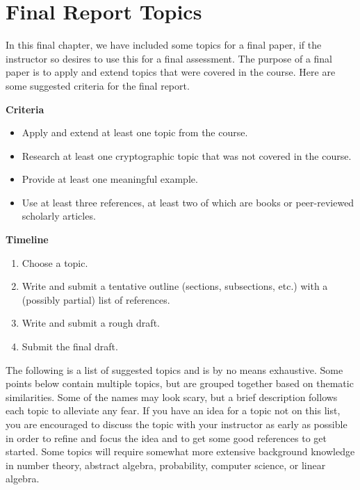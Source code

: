 \chapter{Final Report Topics}
\label{ch:topics}
	In this final chapter, we have included some topics for a final paper, if the instructor so desires to use this for a final assessment. The purpose of a final paper is to apply and extend topics that were covered in the course. Here are some suggested criteria for the final report.

{\bf Criteria}
	\begin{itemize}
		\item Apply and extend at least one topic from the course.
		\item Research at least one cryptographic topic that was not covered in the course.
		\item Provide at least one meaningful example.
		\item Use at least three references, at least two of which are books or peer-reviewed scholarly articles.
	\end{itemize}

{\bf Timeline}
	\begin{enumerate}
		\item Choose a topic.
		\item Write and submit a tentative outline (sections, subsections, etc.) with a (possibly partial) list of references.
		\item Write and submit a rough draft.
		\item Submit the final draft.
	\end{enumerate}

The following is a list of suggested topics and is by no means exhaustive. Some points below contain multiple topics, but are grouped together based on thematic similarities. Some of the names may look scary, but a brief description follows each topic to alleviate any fear. If you have an idea for a topic not on this list, you are encouraged to discuss the topic with your instructor as early as possible in order to refine and focus the idea and to get some good references to get started. Some topics will require somewhat more extensive background knowledge in number theory, abstract algebra, probability, computer science, or linear algebra.

